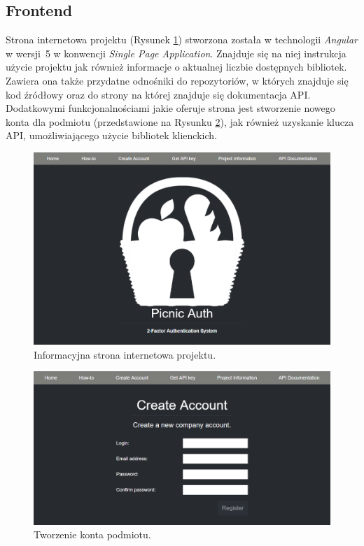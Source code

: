 \subsection{Frontend}
Strona internetowa projektu (Rysunek \ref{front-home}) stworzona została w technologii \textit{Angular} w wersji~5 w konwencji 
\textit{Single Page Application}. Znajduje się na niej instrukcja użycie projektu jak również informacje
o aktualnej liczbie dostępnych bibliotek. Zawiera ona także przydatne odnośniki do repozytoriów, w których
znajduje się kod źródłowy oraz do strony na której znajduje się dokumentacja API. \\
Dodatkowymi funkcjonalnościami jakie oferuje strona jest stworzenie nowego konta dla podmiotu 
(przedstawione na Rysunku \ref{front-create}), jak również uzyskanie klucza API, 
umożliwiającego użycie bibliotek klienckich.
\begin{figure}[t]
    \centering
	\includegraphics[width=\textwidth]{content/images/front-home}
    \caption{Informacyjna strona internetowa projektu.}
    \label{front-home}
\end{figure}
\begin{figure}[t]
    \centering
	\includegraphics[width=\textwidth]{content/images/front-create}
    \caption{Tworzenie konta podmiotu.}
    \label{front-create}
\end{figure}

